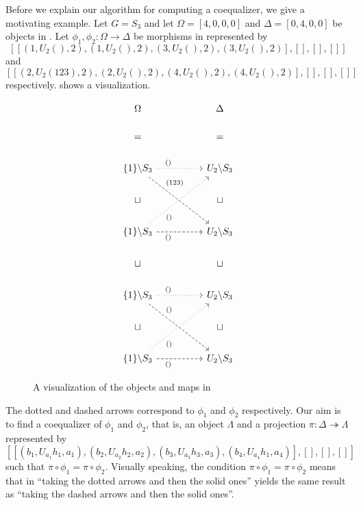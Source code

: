 \begin{exmp}\label{exmp:coequalizers_in_skeletal_G_sets_1}
Before we explain our algorithm for computing a coequalizer, we give a motivating example. Let $G = S_3$ and let $\Omega = [4,0,0,0]$ and $\Delta = [0,4,0,0]$ be objects in \SkeletalGSets{}. Let $\phi_1, \phi_2 \colon \Omega \to \Delta$ be morphisms in \SkeletalGSets{} represented by \[[ [ ( 1, U_2(), 2 ), ( 1, U_2(), 2 ), ( 3, U_2(), 2 ), ( 3, U_2(), 2 ) ], [], [], [] ]\] and \[[ [ ( 2, U_2(123), 2 ), ( 2, U_2(), 2 ), ( 4, U_2(), 2 ), ( 4, U_2(), 2 ) ], [], [], [] ]\] respectively.  shows a visualization.
\begin{figure}
\[
\begin{tikzcd}
\Omega                                                                               &  & \Delta  \\
=                                                                                    &  & =       \\
\{1\} \backslash S_3 \arrow[rr, "()" near start, dotted] \arrow[rrdd, "(123)" near start, dashed]   &  & U_2 \backslash S_3 \\
\sqcup                                                                               &  & \sqcup  \\
\{1\} \backslash S_3 \arrow[rruu, "()"' near start, dotted] \arrow[rr, "()"' near start, dashed]    &  & U_2 \backslash S_3 \\
\sqcup                                                                               &  & \sqcup  \\
\{1\} \backslash S_3 \arrow[rr, "()" near start, dotted] \arrow[rrdd, "()" near start, dashed]      &  & U_2 \backslash S_3 \\
\sqcup                                                                               &  & \sqcup  \\
\{1\} \backslash S_3 \arrow[rruu, "()"' near start, dotted] \arrow[rr, "()"' near start, dashed]    &  & U_2 \backslash S_3
\end{tikzcd}
\]
\caption{A visualization of the objects and maps in }\label{fig:exmp:coequalizers_in_skeletal_G_sets_1_objects_and_maps}
\end{figure}
The dotted and dashed arrows correspond to $\phi_1$ and $\phi_2$ respectively. Our aim is to find a coequalizer of $\phi_1$ and $\phi_2$, that is, an object $\Lambda$ and a projection $\pi\colon \Delta \twoheadrightarrow \Lambda$ represented by \[[ [ ( b_1, U_{a_1}h_1, a_1 ), ( b_2, U_{a_2}h_2, a_2 ), ( b_3, U_{a_3}h_3, a_3 ), ( b_4, U_{a_4}h_1, a_4 ) ], [], [], [] ]\] such that $\pi \circ \phi_1 = \pi \circ \phi_2$. Visually speaking, the condition $\pi \circ \phi_1 = \pi \circ \phi_2$ means that in  ``taking the dotted arrows and then the solid ones'' yields the same result as ``taking the dashed arrows and then the solid ones''.

\end{exmp}
